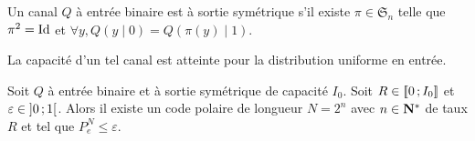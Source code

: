 \begin{defn}
	Un canal $Q$ à entrée binaire est à sortie symétrique s'il existe $\pi \in \mathfrak{S}_n$ telle que $\pi^2 = \operatorname{Id}$ et $\forall y, Q(y \mid 0) = Q(\pi(y) \mid 1)$.
\end{defn}

\begin{rem}
	La capacité d'un tel canal est atteinte pour la distribution uniforme en entrée.
\end{rem}

\begin{thm}
	Soit $Q$ à entrée binaire et à sortie symétrique de capacité $I_0$.
	Soit $R \in \mathopen{[\![}0\mathclose{}\mathpunct{};I_0\mathclose{]\!]}$ et $\varepsilon \in \mathopen{]}0\mathclose{}\mathpunct{};1\mathclose{[}$.
	Alors il existe un code polaire de longueur $N = 2^n$ avec $n \in \mathbf{N}^*$ de taux $R$ et tel que $P_e^N \leq \varepsilon$.
\end{thm}